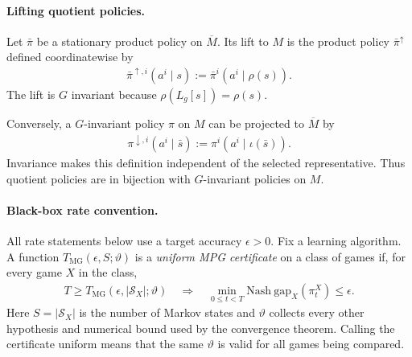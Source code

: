 \documentclass{article}
\theoremstyle{plain}
\theoremstyle{definition}
\theoremstyle{remark}
\newcommand{\Nash}{\mathrm{Nash\ gap}}
\newcommand{\abs}[1]{\left\lvert#1\right\rvert}
\newcommand{\quotient}[1]{\overline{#1}}
\begin{document}
\paragraph{Lifting quotient policies.}
Let $\bar\pi$ be a stationary product policy on $\quotient M$. Its lift to $M$ is
the product policy $\bar\pi^\uparrow$ defined coordinatewise by
\begin{align*}
  \bar\pi^{\uparrow,i}(a^i\mid s)
  :=
  \bar\pi^i(a^i\mid\rho(s)).
\end{align*}
The lift is $G$ invariant because $\rho(L_g[s])=\rho(s)$.

Conversely, a $G$-invariant policy $\pi$ on $M$ can be projected to
$\quotient M$ by
\begin{align*}
  \pi^{\downarrow,i}(a^i\mid\bar s)
  :=
  \pi^i(a^i\mid\iota(\bar s)).
\end{align*}
Invariance makes this definition independent of the selected representative.
Thus quotient policies are in bijection with $G$-invariant policies on $M$.

\paragraph{Black-box rate convention.}
All rate statements below use a target accuracy $\epsilon>0$.
Fix a learning algorithm.  A function
$T_{\mathrm{MG}}(\epsilon,S;\vartheta)$ is a \emph{uniform MPG certificate} on
a class of games if, for every game $X$ in the class,
\begin{align}
  T\ge T_{\mathrm{MG}}
  (\epsilon,\abs{\mathcal S_X};\vartheta)
  \quad\Longrightarrow\quad
  \min_{0\le t<T}\Nash_X(\pi_t^X)\le\epsilon.
  \label{eq:uniform-mpg-rate-profile}
\end{align}
Here $S=\abs{\mathcal S_X}$ is the number of Markov states and $\vartheta$
collects every other hypothesis and numerical bound used by the convergence
theorem.  Calling the certificate uniform means that the same $\vartheta$ is
valid for all games being compared.
\end{document}
